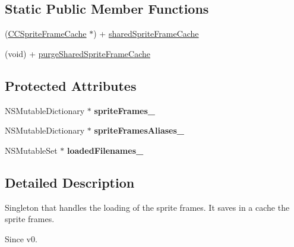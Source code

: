 \subsection*{Static Public Member Functions}
\begin{DoxyCompactItemize}
\item 
(\hyperlink{class_c_c_sprite_frame_cache}{C\-C\-Sprite\-Frame\-Cache} $\ast$) + \hyperlink{class_c_c_sprite_frame_cache_a2212ce69087afeea57ff2d677e67fdc6}{shared\-Sprite\-Frame\-Cache}
\item 
(void) + \hyperlink{class_c_c_sprite_frame_cache_ae31b11409c7483fa7f3e7e80f2ae8d03}{purge\-Shared\-Sprite\-Frame\-Cache}
\end{DoxyCompactItemize}
\subsection*{Protected Attributes}
\begin{DoxyCompactItemize}
\item 
\hypertarget{class_c_c_sprite_frame_cache_a63895824fd418189b8fcc0edad5226a7}{N\-S\-Mutable\-Dictionary $\ast$ {\bfseries sprite\-Frames\-\_\-}}\label{class_c_c_sprite_frame_cache_a63895824fd418189b8fcc0edad5226a7}

\item 
\hypertarget{class_c_c_sprite_frame_cache_a8612ebfd3afe3db670c1926ab42357ed}{N\-S\-Mutable\-Dictionary $\ast$ {\bfseries sprite\-Frames\-Aliases\-\_\-}}\label{class_c_c_sprite_frame_cache_a8612ebfd3afe3db670c1926ab42357ed}

\item 
\hypertarget{class_c_c_sprite_frame_cache_a185a13190afd34d1e2db08fa579cb2d4}{N\-S\-Mutable\-Set $\ast$ {\bfseries loaded\-Filenames\-\_\-}}\label{class_c_c_sprite_frame_cache_a185a13190afd34d1e2db08fa579cb2d4}

\end{DoxyCompactItemize}


\subsection{Detailed Description}
Singleton that handles the loading of the sprite frames. It saves in a cache the sprite frames. \begin{DoxySince}{Since}
v0. 
\end{DoxySince}


